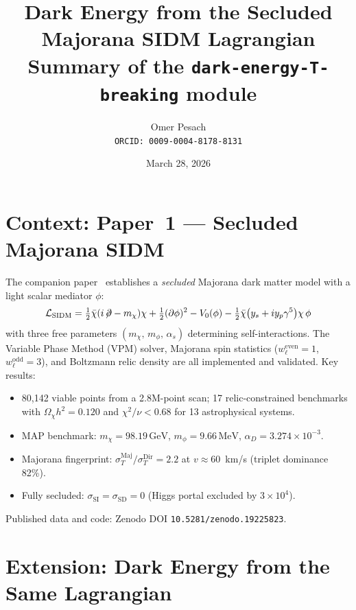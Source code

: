 \documentclass[11pt,a4paper]{article}
\title{\textbf{Dark Energy from the Secluded Majorana SIDM Lagrangian}\\[6pt]
\large Summary of the \texttt{dark-energy-T-breaking} module}
\author{Omer Pesach\\
\small \texttt{ORCID: 0009-0004-8178-8131}}
\date{March 28, 2026}
\newcommand{\GeV}{\,\mathrm{GeV}}
\newcommand{\MeV}{\,\mathrm{MeV}}
\begin{document}
\maketitle

\section{Context: Paper~1 --- Secluded Majorana SIDM}

The companion paper~\cite{paper1} establishes a \emph{secluded} Majorana dark matter model with a light scalar mediator $\phi$:
\begin{equation}
\mathcal{L}_{\mathrm{SIDM}} = \tfrac{1}{2}\bar\chi(i\!\not\!\partial - m_\chi)\chi + \tfrac{1}{2}(\partial\phi)^2 - V_0(\phi) - \tfrac{1}{2}\bar\chi\bigl(y_s + iy_p\gamma^5\bigr)\chi\,\phi
\end{equation}
with three free parameters $(m_\chi,\,m_\phi,\,\alpha_s)$ determining self-interactions. The Variable Phase Method (VPM) solver, Majorana spin statistics ($w_\ell^{\mathrm{even}}=1$, $w_\ell^{\mathrm{odd}}=3$), and Boltzmann relic density are all implemented and validated. Key results:
\begin{itemize}[nosep]
  \item 80{,}142 viable points from a 2.8M-point scan; 17 relic-constrained benchmarks with $\Omega_\chi h^2=0.120$ and $\chi^2/\nu<0.68$ for 13 astrophysical systems.
  \item MAP benchmark: $m_\chi=98.19\GeV$, $m_\phi=9.66\MeV$, $\alpha_D=3.274\times10^{-3}$.
  \item Majorana fingerprint: $\sigma_T^{\mathrm{Maj}}/\sigma_T^{\mathrm{Dir}}=2.2$ at $v\approx60$~km/s (triplet dominance 82\%).
  \item Fully secluded: $\sigma_{\mathrm{SI}}=\sigma_{\mathrm{SD}}=0$ (Higgs portal excluded by $3\times10^4$).
\end{itemize}
Published data and code: Zenodo DOI \texttt{10.5281/zenodo.19225823}.

\section{Extension: Dark Energy from the Same Lagrangian}
\end{document}

